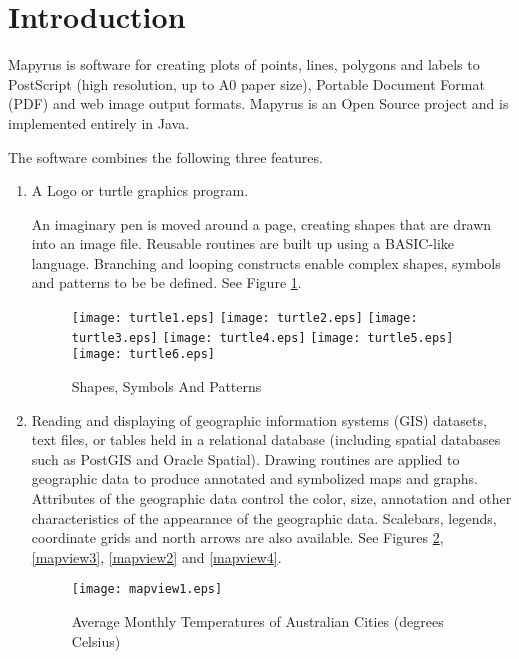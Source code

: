 
\section{Introduction}

Mapyrus is software for creating plots of points, lines, polygons and labels 
to PostScript (high resolution, up to A0 paper size),
Portable Document Format (PDF) and web image output formats.
Mapyrus is an Open Source project and is implemented entirely in Java.

The software combines the following three features.

\begin{enumerate}
\item

A Logo or turtle graphics program.

An imaginary pen is moved around a page,
creating shapes that are drawn into an image file.
Reusable routines are built up using a BASIC-like language.
Branching and looping constructs enable complex shapes, symbols and patterns
to be be defined.  See Figure \ref{turtle}.

\begin{figure}[htb]
\texttt{[image: turtle1.eps]}
\texttt{[image: turtle2.eps]}
\texttt{[image: turtle3.eps]}
\texttt{[image: turtle4.eps]}
\texttt{[image: turtle5.eps]}
\texttt{[image: turtle6.eps]}
\caption{Shapes, Symbols And Patterns}
\label{turtle}
\end{figure}

\item

Reading and displaying of geographic information
systems (GIS) datasets, text files, or tables held in a relational database
(including spatial databases such as PostGIS and Oracle Spatial).
Drawing routines are applied to geographic data to produce annotated and
symbolized maps and graphs.  Attributes of the geographic data control
the color, size, annotation and other characteristics of the
appearance of the geographic data.
Scalebars, legends, coordinate grids and north arrows are also available.
See Figures \ref{mapview1}, \ref{mapview3}, \ref{mapview2} and
\ref{mapview4}.

\begin{figure}
\texttt{[image: mapview1.eps]}
\caption[Average Monthly Temperatures]{Average Monthly Temperatures of Australian Cities (degrees Celsius)}
\label{mapview1}
\end{figure}


\end{enumerate}
